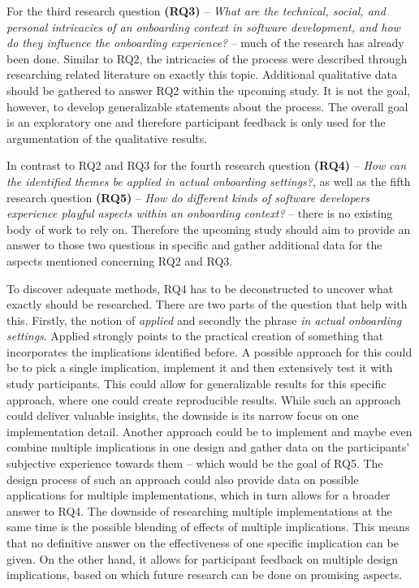 For the third research question \textbf{(RQ3)} -- \textit{What are the technical, social, and personal intricacies of an onboarding context in software development, and how do they influence the onboarding experience?} -- much of the research has already been done. Similar to RQ2, the intricacies of the process were described through researching related literature on exactly this topic. Additional qualitative data should be gathered to answer RQ2 within the upcoming study. It is not the goal, however, to develop generalizable statements about the process. The overall goal is an exploratory one and therefore participant feedback is only used for the argumentation of the qualitative results.

In contrast to RQ2 and RQ3 for the fourth research question \textbf{(RQ4)} -- \textit{How can the identified themes be applied in actual onboarding settings?}, as well as the fifth research question \textbf{(RQ5)} -- \textit{How do different kinds of software developers experience playful aspects within an onboarding context?} -- there is no existing body of work to rely on. Therefore the upcoming study should aim to provide an answer to those two questions in specific and gather additional data for the aspects mentioned concerning RQ2 and RQ3.

To discover adequate methods, RQ4 has to be deconstructed to uncover what exactly should be researched. There are two parts of the question that help with this. Firstly, the notion of \textit{applied} and secondly the phrase \textit{in actual onboarding settings}. Applied strongly points to the practical creation of something that incorporates the implications identified before. A possible approach for this could be to pick a single implication, implement it and then extensively test it with study participants. This could allow for generalizable results for this specific approach, where one could create reproducible results. While such an approach could deliver valuable insights, the downside is its narrow focus on one implementation detail. Another approach could be to implement and maybe even combine multiple implications in one design and gather data on the participants' subjective experience towards them -- which would be the goal of RQ5. The design process of such an approach could also provide data on possible applications for multiple implementations, which in turn allows for a broader answer to RQ4. The downside of researching multiple implementations at the same time is the possible blending of effects of multiple implications. This means that no definitive answer on the effectiveness of one specific implication can be given. On the other hand, it allows for participant feedback on multiple design implications, based on which future research can be done on promising aspects.

